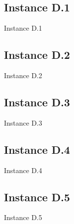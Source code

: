 \subsection{Instance D.1}
\begin{table}[H]
\centering

\caption{Instance D.1}
\label{tblscpD1}
\end{table}
\newpage

\subsection{Instance D.2}
\begin{table}[H]
\centering

\caption{Instance D.2}
\label{tblscpD2}
\end{table}
\newpage

\subsection{Instance D.3}
\begin{table}[H]
\centering

\caption{Instance D.3}
\label{tblscpD3}
\end{table}
\newpage

\subsection{Instance D.4}
\begin{table}[H]
\centering

\caption{Instance D.4}
\label{tblscpD4}
\end{table}
\newpage

\subsection{Instance D.5}
\begin{table}[H]
\centering

\caption{Instance D.5}
\label{tblscpD5}
\end{table}
\newpage


